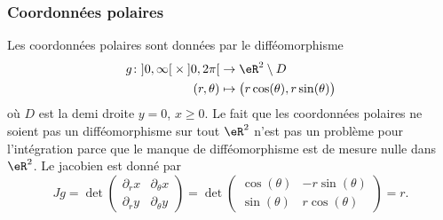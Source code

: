 					\subsubsection{Coordonnées polaires}

Les coordonnées polaires sont données par le difféomorphisme
\begin{equation}
	\begin{aligned}
		g\colon \mathopen]0,\infty\mathclose[\times\mathopen]0,2\pi\mathclose[ &\to\eR^2\setminus D\\
		(r,\theta)&\mapsto \big( r\cos(\theta),r\sin(\theta) \big)
	\end{aligned}
\end{equation}
où $D$ est la demi droite $y=0$, $x\geq 0$. Le fait que les coordonnées polaires ne soient pas un difféomorphisme sur tout $\eR^2$ n'est pas un problème pour l'intégration parce que le manque de difféomorphisme est de mesure nulle dans $\eR^2$. Le jacobien est donné par
\begin{equation}
	Jg=\det\begin{pmatrix}
	\partial_rx	&	\partial_{\theta}x	\\ 
	\partial_ry	&	\partial_{\theta}y
\end{pmatrix}=\det\begin{pmatrix}
	\cos(\theta)	&	-r\sin(\theta)	\\ 
	\sin(\theta)	&	r\cos(\theta)	
\end{pmatrix}=r.
\end{equation}

